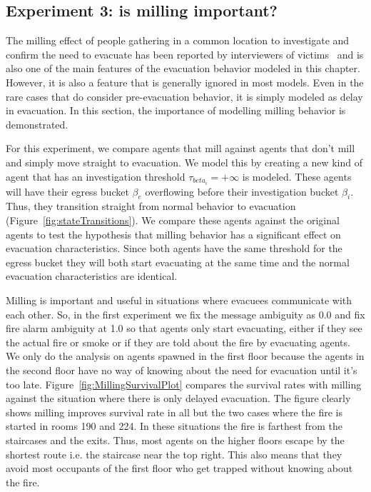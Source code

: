 
\subsection{Experiment 3: is milling important?} %
\label{sec:experiment_3_modelling_the_effect_of_pre_evacuation_behavior}

The milling effect of people gathering in a common location to investigate and confirm the need to evacuate has been reported by interviewers of victims~\cite{Fahy:2010to,Purser:2001ts} and is also one of the main features of the evacuation behavior modeled in this chapter. However, it is also a feature that is generally ignored in most models. Even in the rare cases that do consider pre-evacuation behavior, it is simply modeled as delay in evacuation. In this section, the importance of modelling milling behavior is demonstrated.

For this experiment, we compare agents that mill against agents that don't mill and simply move straight to evacuation. We model this by creating a new kind of agent that has an investigation threshold $\tau_{beta_{i}}= +\infty$ is modeled. These agents will have their egress bucket $\beta_{e}$ overflowing before their investigation bucket $\beta_{i}$. Thus, they transition straight from normal behavior to evacuation (Figure~\ref{fig:stateTransitions}). We compare these agents against the original agents to test the hypothesis that milling behavior has a significant effect on evacuation characteristics. Since both agents have the same threshold for the egress bucket they will both start evacuating at the same time and the normal evacuation characteristics are identical.

Milling is important and useful in situations where evacuees communicate with each other. So, in the first experiment we fix the message ambiguity as 0.0 and fix fire alarm ambiguity at 1.0 so that agents only start evacuating, either if they see the actual fire or smoke or if they are told about the fire by evacuating agents. We only do the analysis on agents spawned in the first floor because the agents in the second floor have no way of knowing about the need for evacuation until it's too late. Figure~\ref{fig:MillingSurvivalPlot} compares the survival rates with milling against the situation where there is only delayed evacuation. The figure clearly shows milling improves survival rate in all but the two cases where the fire is started in rooms 190 and 224. In these situations the fire is farthest from the staircases and the exits. Thus, most agents on the higher floors escape by the shortest route i.e. the staircase near the top right. This also means that they avoid most occupants of the first floor who get trapped without knowing about the fire.

